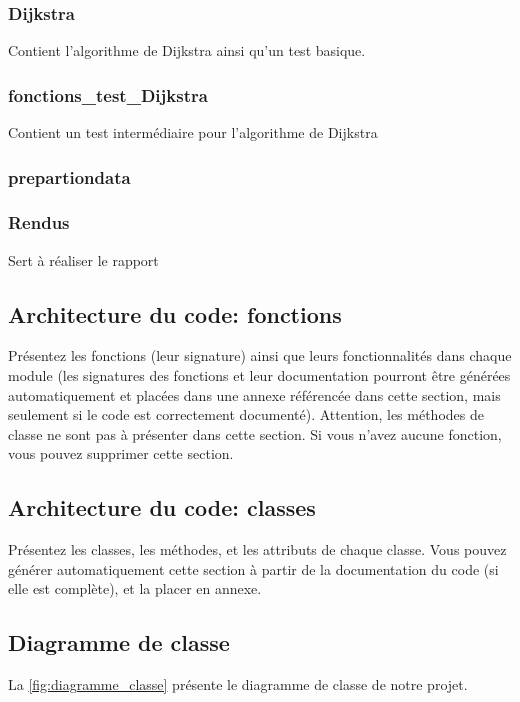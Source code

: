 \documentclass[11pt,a4paper]{article}
\begin{document}
\subsubsection{Dijkstra}
 Contient l'algorithme de Dijkstra ainsi qu'un test basique.

\subsubsection{fonctions_test_Dijkstra}
 Contient un test intermédiaire pour l'algorithme de Dijkstra
\subsubsection{prepartiondata}

\subsubsection{Rendus}
Sert à réaliser le rapport


\subsection{Architecture du code: fonctions}

Présentez les fonctions (leur signature) ainsi que leurs fonctionnalités dans chaque module (les signatures des fonctions et leur documentation pourront être générées automatiquement et placées dans une annexe référencée dans cette section, mais seulement si le code est correctement documenté).
Attention, les méthodes de classe ne sont pas à présenter dans cette section.
Si vous n'avez aucune fonction, vous pouvez supprimer cette section.

\subsection{Architecture du code: classes}

Présentez les classes, les méthodes, et les attributs de chaque classe.
Vous pouvez générer automatiquement cette section à partir de la documentation du code (si elle est complète), et la placer en annexe.

\subsection{Diagramme de classe}

La \autoref{fig:diagramme_classe} présente le diagramme de classe de notre projet.
\end{document}
